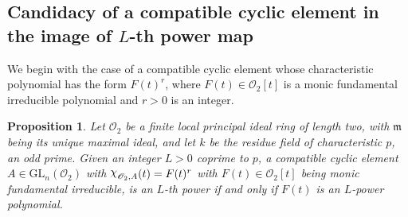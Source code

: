 \documentclass[11pt,twoside]{amsart}
\newcommand{\GL}{\mathrm{GL}}
\newcommand{\upchi}{\raisebox{0.4ex}{$\chi$}}
\newcommand{\Char}{\upchi}
\newcommand{\R}{\mathscr{O}_2}
\newtheorem{proposition}[lemma]{Proposition}
\theoremstyle{definition} %
\begin{document}
\subsection{Candidacy  of a compatible cyclic element in the image of $L$-th power map}
We begin with the case of a compatible cyclic element whose characteristic polynomial has the form $F(t)^r$, where $F(t)\in\R[t]$ is a monic fundamental irreducible polynomial and $r>0$ is an integer.
\begin{proposition}\label{prop:cyclic-single-poly}
Let $\R$ be a finite local principal ideal ring of length two, with $\mathfrak{m}$ being its unique maximal ideal, and let $k$ be the residue field of characteristic $p$, an odd prime.  
Given an integer $L>0$ coprime to $p$, a compatible cyclic element $A\in \GL_n(\R)$ with $\Char_{\R,A}(t)=F(t)^r$ with $F(t)\in\R[t]$ being monic fundamental irreducible, is an $L$-th power if and only if $F(t)$ is an $L$-power polynomial. 
\end{proposition}
\end{document}
